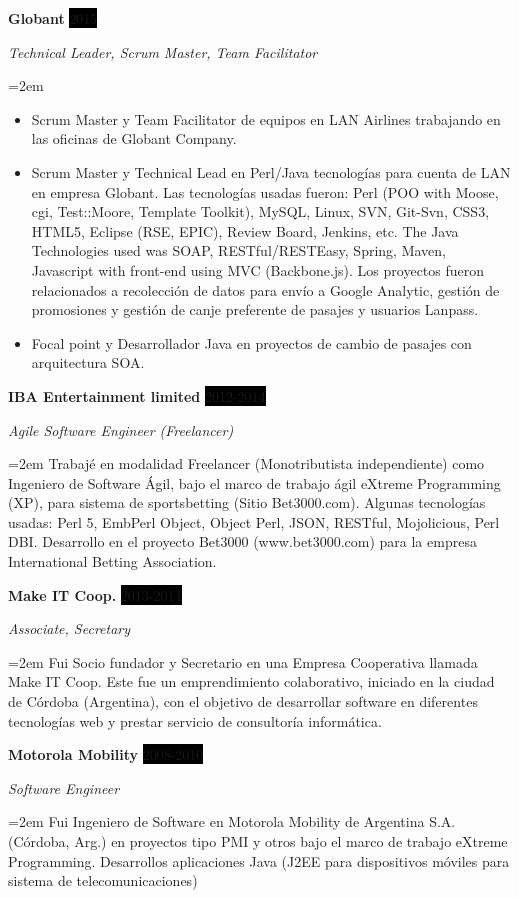 \documentclass[paper=a4,fontsize=11pt]{scrartcl} %
\newcommand{\sepspace}{\vspace*{1em}}		%
\newcommand{\EducationEntry}[4]{
		\noindent \textbf{#1} \hfill      %
		\colorbox{Black}{%
			\parbox{6em}{%
			\hfill\color{White}#2}} \par  %
		\noindent \textit{#3} \par        %
		\noindent\hangindent=2em\hangafter=0 \small #4 %
		\normalsize \par}
\newcommand{\WorkEntry}[4]{				  %
		\noindent \textbf{#1} \hfill      %
		\colorbox{Black}{\color{White}#2} \par  %
		\noindent \textit{#3} \par              %
		\noindent\hangindent=2em\hangafter=0 \small #4 %
		\normalsize \par}
\begin{document}
\sepspace

\WorkEntry{Globant}{2015}{Technical Leader, Scrum Master, Team Facilitator}
{
\begin{itemize}
\item Scrum Master y Team Facilitator de equipos en LAN Airlines trabajando en las oficinas de Globant Company.
\item Scrum Master y Technical Lead en Perl/Java tecnologías para cuenta de LAN en empresa Globant. Las tecnologías usadas fueron: Perl (POO with Moose, cgi, Test::Moore, Template Toolkit), MySQL, Linux, SVN, Git-Svn, CSS3, HTML5, Eclipse (RSE, EPIC), Review Board, Jenkins, etc. The Java Technologies used was SOAP, RESTful/RESTEasy, Spring, Maven, Javascript with front-end using MVC (Backbone.js). Los proyectos fueron  relacionados a recolección de datos para envío a Google Analytic, gestión de promosiones y gestión de canje preferente de pasajes y usuarios Lanpass.
\item Focal point y Desarrollador Java en proyectos de cambio de pasajes con arquitectura SOA.
\end{itemize}
}

\sepspace

\WorkEntry{IBA Entertainment limited}{2012-2014}{Agile Software Engineer (Freelancer)}
{Trabajé en modalidad Freelancer (Monotributista independiente) como Ingeniero de Software Ágil, bajo el marco de trabajo ágil eXtreme Programming (XP), para sistema de sportsbetting (Sitio Bet3000.com). Algunas tecnologías usadas: Perl 5, EmbPerl Object, Object Perl, JSON, RESTful, Mojolicious, Perl DBI. Desarrollo en el proyecto Bet3000 (www.bet3000.com) para la empresa International Betting Association.}

\sepspace

\WorkEntry{Make IT Coop.}{2013-2014}{Associate, Secretary}{
Fui Socio fundador y Secretario en una Empresa Cooperativa llamada Make IT Coop. Este fue un emprendimiento colaborativo, iniciado en la ciudad de Córdoba (Argentina), con el objetivo de desarrollar software en diferentes tecnologías web y prestar servicio de consultoría informática.
}

\sepspace

\WorkEntry{Motorola Mobility}{2008-2010}{Software Engineer}
{Fui Ingeniero de Software en Motorola Mobility de Argentina S.A. (Córdoba, Arg.) en proyectos tipo PMI y otros bajo el marco de trabajo eXtreme Programming. Desarrollos aplicaciones Java (J2EE para dispositivos móviles para sistema de telecomunicaciones)}
\end{document}
